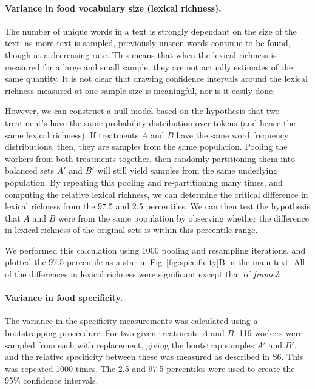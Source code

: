 \documentclass[12pt]{article}
\begin{document}
	\paragraph{Variance in food vocabulary size (lexical richness).}
	The number of unique words in a text is strongly dependant on the size
	of the text: as more text is sampled, previously unseen words continue
	to be found, though at a decreasing rate.  This means that when the 
	lexical richness is measured for a large and small sample, they are not 
	actually estimates of the same quantity.  It is not clear that drawing 
	confidence intervals around the lexical richness measured at one sample 
	size is meaningful, nor is it easily done.

	However, we can construct a null model based on the hypothesis that
	two treatment's have the same probability distribution over tokens
	(and hence the same lexical richness). If treatments $A$ and $B$ have
	the same word frequency distributions, then, they are samples from
	the same population.  Pooling the workers from both treatments together,
	then randomly partitioning them into balanced sets $A'$ and $B'$ will
	still yield samples from the same underlying population.  By repeating 
	this pooling and re-partitioning many times, and computing the 
	relative lexical richness, we can determine the critical difference in
	lexical richness from the 97.5 and 2.5 percentiles.  We can then test 
	the hypothesis that $A$ and $B$ were from the same population by 
	observing whether the difference in lexical richness of the original 
	sets is within this percentile range.
	
	We performed this calculation using 1000 pooling and resampling 
	iterations, and plotted the 97.5 percentile as a star in 
	Fig~\ref{fig:specificity}B in the main text.  All of the differences
	in lexical richness were significant except that of \textit{frame2}.

	\paragraph{Variance in food specificity.}
	The variance in the specificity measurements was calculated using a 
	bootstrapping proceedure.  For two given treatments $A$ and $B$, 
	119 workers were sampled from each with replacement, giving the bootstrap
	samples $A'$ and $B'$, and the relative specificity between these 
	was measured as described in \textsection S6.
	This was repeated 1000 times.  The 2.5 and 97.5 percentiles were used
	to create the 95\% confidence intervals.
\end{document}
